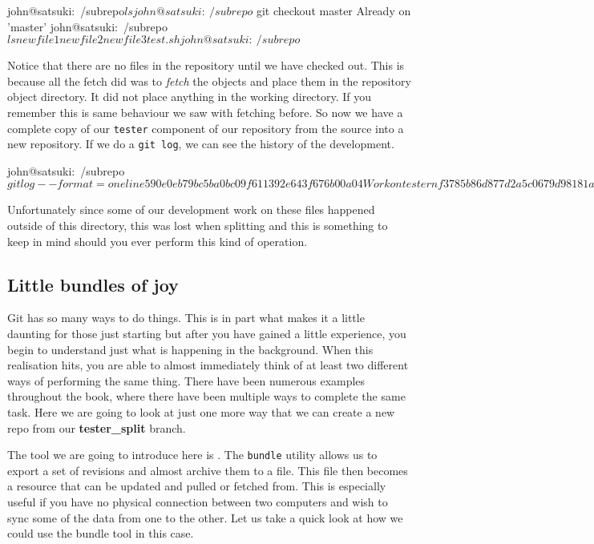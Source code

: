 {\begin{code}
john@satsuki:~/subrepo$ ls
john@satsuki:~/subrepo$ git checkout master
Already on 'master'
john@satsuki:~/subrepo$ ls
newfile1  newfile2  newfile3  test.sh
john@satsuki:~/subrepo$ 
\end{code}

Notice that there are no files in the repository until we have checked out.
This is because all the fetch did was to \emph{fetch} the objects and place them in the repository object directory.
It did not place anything in the working directory.
If you remember this is same behaviour we saw with fetching before.
So now we have a complete copy of our \texttt{tester} component of our repository from the source into a new repository.
If we do a \texttt{git log}, we can see the history of the development.

\begin{code}
john@satsuki:~/subrepo$ git log --format=oneline
590e0eb79bc5ba0bc09f611392e643f676b00a04 Work on tester nf3
785b86d877d2a5c0679d98181a23d06ed2ba7652 Work on tester nf2
1ff89f787438f081a0d74de2d26eb2d831c9c738 Work on tester nf1
a5a0d9762dd4b50d8f3228e37b315f6056d5a034 Moved testing suite
john@satsuki:~/subrepo$ 
\end{code}

Unfortunately since some of our development work on these files happened outside of this directory,
this was lost when splitting and this is something to keep in mind should you ever perform this kind of operation.

\subsection{Little bundles of joy}
Git has so many ways to do things.
This is in part what makes it a little daunting for those just starting but after you have gained a little experience, you begin to understand just what is happening in the background.
When this realisation hits, you are able to almost immediately think of at least two different ways of performing the same thing.
There have been numerous examples throughout the book, where there have been multiple ways to complete the same task.
Here we are going to look at just one more way that we can create a new repo from our \textbf{tester\_split} branch.

The tool we are going to introduce here is .
The \texttt{bundle} utility allows us to export a set of revisions and almost archive them to a file.
This file then becomes a resource that can be updated and pulled or fetched from.
This is especially useful if you have no physical connection between two computers and wish to sync some of the data from one to the other.
Let us take a quick look at how we could use the bundle tool in this case.

}
